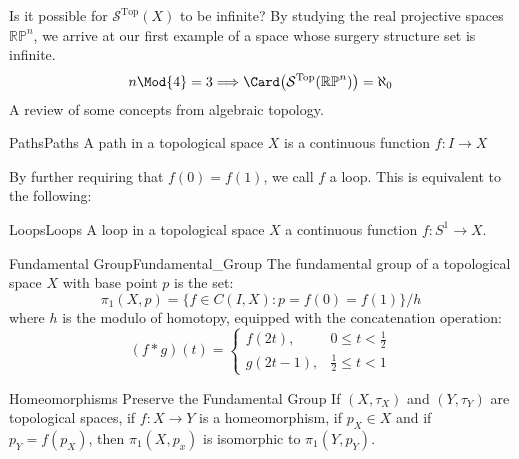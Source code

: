 \documentclass{book}                                                           %
\begin{document}
            Is it possible for $\mathcal{S}^{\textrm{Top}}(X)$ to be infinite?
            By studying the real projective spaces $\mathbb{RP}^{n}$, we
            arrive at our first example of a space whose surgery structure
            set is infinite.
            \begin{equation}
                n\Mod{4}=3
                \Longrightarrow
                \Card\big(\mathcal{S}^{\textrm{Top}}(\mathbb{RP}^{n})\big)
                =\aleph_{0}
            \end{equation}
            A review of some concepts from algebraic topology.
            \begin{ldefinition}{Paths}{Paths}
                A path in a topological space $X$ is a
                continuous function $f:I\rightarrow{X}$
            \end{ldefinition}
            By further requiring that $f(0)=f(1)$, we call $f$ a loop. This is
            equivalent to the following:
            \begin{ldefinition}{Loops}{Loops}
                A loop in a topological space $X$ a continuous function
                $f:S^{1}\rightarrow{X}$.
            \end{ldefinition}
            \begin{ldefinition}{Fundamental Group}{Fundamental_Group}
                The fundamental group of a topological space
                $X$ with base point $p$ is the set:
                \begin{equation}
                    \pi_{1}(X,p)=
                    \{f\in{C(I,X)}:p=f(0)=f(1)\}/h
                \end{equation}
                where $h$ is the modulo of homotopy,
                equipped with the concatenation operation:
                \begin{equation}
                    (f*g)(t)=
                    \begin{cases}
                        f(2t),&0\leq{t}<\frac{1}{2}\\
                        g(2t-1),&\frac{1}{2}\leq{t}<1
                    \end{cases}
                \end{equation}
            \end{ldefinition}
            \begin{ltheorem}{Homeomorphisms Preserve the Fundamental Group}
                If $(X,\tau_{X})$ and $(Y,\tau_{Y})$ are topological spaces,
                if $f:X\rightarrow{Y}$ is a homeomorphism, if $p_{X}\in{X}$ and
                if $p_{Y}=f(p_{X})$, then $\pi_{1}(X,p_{x})$ is isomorphic
                to $\pi_{1}(Y,p_{Y})$.
            \end{ltheorem}
\end{document}

